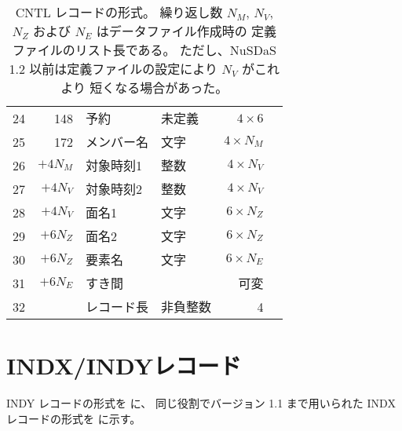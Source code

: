 \begin{table}[htp]
\begin{center}
\begin{tabular}{rr|llrl}
 24 & 148 & 予約	& 未定義 & \(4 \times 6\) & \\
 25 & 172 & メンバー名	& 文字 & \(4 \times N_M\) & \\
 26 & $+4N_M$ & 対象時刻1 & 整数 & \(4 \times N_V\) & \\
 27 & $+4N_V$ & 対象時刻2 & 整数 & \(4 \times N_V\) & \\
 28 & $+4N_V$ & 面名1 & 文字 & \(6 \times N_Z\) & \\
 29 & $+6N_Z$ & 面名2 & 文字 & \(6 \times N_Z\) & \\
 30 & $+6N_Z$ & 要素名 & 文字 & \(6 \times N_E\) & \\
 \hline
 31 & $+6N_E$ & すき間 & & 可変 & \\
 32 &  & レコード長 & 非負整数 & 4 & \\
 \hline
 \end{tabular}
 \end{center}
 \caption[CNTL レコードの形式]{%
  CNTL レコードの形式。
  繰り返し数 $N_M$, $N_V$, $N_Z$ および $N_E$ はデータファイル作成時の
  定義ファイルのリスト長である。
  ただし、NuSDaS 1.2 以前は定義ファイルの設定により $N_V$ がこれより
  短くなる場合があった。
 }
 \label{table.fmt.cntl}
\end{table}

\newpage
\section{INDX/INDYレコード}
\label{sec:fmt.indx}

INDY レコードの形式を  に、
同じ役割でバージョン 1.1 まで用いられた
INDX レコードの形式を  に示す。

